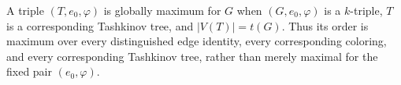 \begin{definition}
A triple $(T,e_0,\varphi)$ is globally maximum for $G$ when
$(G,e_0,\varphi)$ is a $k$-triple, $T$ is a corresponding Tashkinov tree,
and $|V(T)|=t(G)$.  Thus its order is maximum over every distinguished edge
identity, every corresponding coloring, and every corresponding Tashkinov
tree, rather than merely maximal for the fixed pair $(e_0,\varphi)$.
\end{definition}
